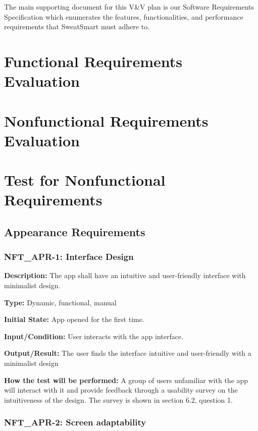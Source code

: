 \documentclass[12pt, titlepage]{article}
\begin{document}
The main supporting document for this V\&V plan is our Software Requirements Specification which enumerates the features, functionalities, and performance requirements that SweatSmart must adhere to. 
\section{Functional Requirements Evaluation}

\section{Nonfunctional Requirements Evaluation}

\setlength\parindent{0pt}
\maketitle

\section{Test for Nonfunctional Requirements  }

\subsection{Appearance Requirements }

\subsubsection*{\textbf{NFT\_APR-1: Interface Design}}

\textbf{Description:} The app shall have an intuitive and user-friendly interface with minimalist design. 

\textbf{Type:} Dynamic, functional, manual

\textbf{Initial State:} App opened for the first time.

\textbf{Input/Condition:} User interacts with the app interface.

\textbf{Output/Result:} The user finds the interface intuitive and user-friendly with a minimalist design

\textbf{How the test will be performed:} A group of users unfamiliar with the app will interact with it and provide feedback through a usability survey on the intuitiveness of the design. The survey is shown in section 6.2, question 1.  

\subsubsection*{\textbf{NFT\_APR-2: Screen adaptability}}
\end{document}
